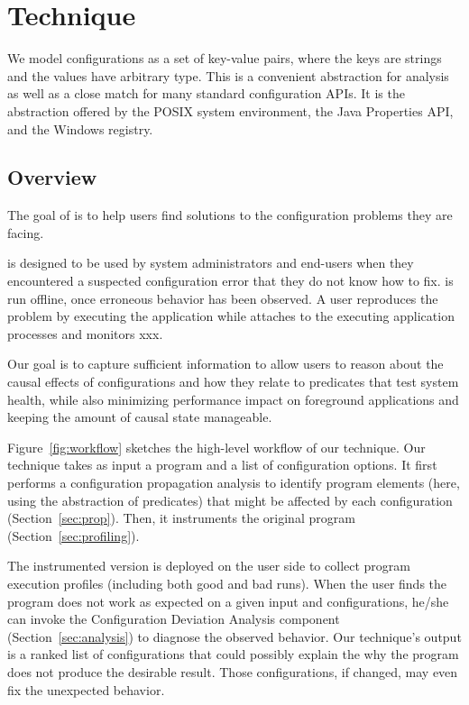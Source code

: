 \section{Technique}
\label{sec:technique}

We model configurations as a set of key-value pairs, where
the keys are strings and the values have arbitrary type. This is a
convenient abstraction for analysis as well as a close match for
many standard configuration APIs. It is the abstraction offered
by the POSIX system environment, the Java Properties API,
and the Windows registry.


\subsection{Overview}

The goal of \ourtool is to help users find solutions to the configuration
problems they are facing.

\ourtool is designed to be used by system administrators and end-users when they
encountered a suspected configuration error that they do not
know how to fix. \ourtool is run offline, once erroneous
behavior has been observed. A \ourtool user reproduces
the problem by executing the application while \ourtool attaches to
the executing application processes and monitors xxx.

Our goal is to capture sufficient information to allow users to reason
about the causal effects of configurations and how they relate to
predicates that test system health, while also minimizing performance impact
on foreground applications and keeping the amount of causal state manageable.


Figure~\ref{fig:workflow} sketches the high-level workflow of our technique.
Our technique takes as input a program and a list of configuration options.
It first performs a configuration propagation analysis to identify
program elements (here, using the abstraction of predicates) that might be
affected by each configuration (Section~\ref{sec:prop}). Then, it
instruments the original program (Section~\ref{sec:profiling}).

The instrumented version is deployed on the user side to collect program execution
profiles (including both good and bad runs). When the user finds the program
does not work as expected on a given input and configurations,
he/she can invoke the Configuration Deviation Analysis component (Section~\ref{sec:analysis}) to
diagnose the observed behavior. Our technique's output is a ranked list of
configurations that could possibly explain the why the program does not produce the desirable result. Those
configurations, if changed, may even fix the unexpected behavior.



